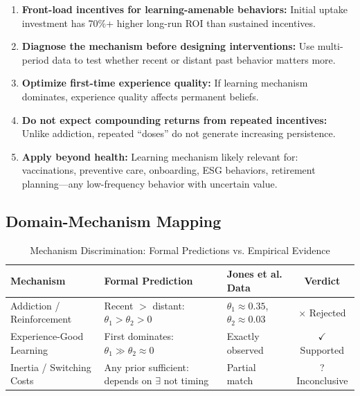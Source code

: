 \begin{tcolorbox}[colback=green!5!white, colframe=green!75!black,
    title=Practical Implications]
\begin{enumerate}
\item \textbf{Front-load incentives for learning-amenable behaviors:}
   Initial uptake investment has 70\%+ higher long-run ROI than sustained incentives.

\item \textbf{Diagnose the mechanism before designing interventions:}
   Use multi-period data to test whether recent or distant past behavior matters more.

\item \textbf{Optimize first-time experience quality:}
   If learning mechanism dominates, experience quality affects permanent beliefs.

\item \textbf{Do not expect compounding returns from repeated incentives:}
   Unlike addiction, repeated ``doses'' do not generate increasing persistence.

\item \textbf{Apply beyond health:}
   Learning mechanism likely relevant for: vaccinations, preventive care, onboarding,
   ESG behaviors, retirement planning---any low-frequency behavior with uncertain value.
\end{enumerate}
\end{tcolorbox}

\subsection{Domain-Mechanism Mapping}

\begin{table}[htbp]
\centering
\caption{Mechanism Discrimination: Formal Predictions vs. Empirical Evidence}
\label{tab:hf-mechanism-discrimination}
\renewcommand{\arraystretch}{1.4}
\begin{tabular}{@{}p{3cm}p{4.5cm}p{3cm}c@{}}
\toprule
\textbf{Mechanism} & \textbf{Formal Prediction} & \textbf{Jones et al. Data} & \textbf{Verdict} \\
\midrule
Addiction / Reinforcement & Recent $>$ distant: $\theta_1 > \theta_2 > 0$ & $\theta_1 \approx 0.35$, $\theta_2 \approx 0.03$ & $\times$ Rejected \\
Experience-Good Learning & First dominates: $\theta_1 \gg \theta_2 \approx 0$ & Exactly observed & $\checkmark$ Supported \\
Inertia / Switching Costs & Any prior sufficient: depends on $\exists$ not timing & Partial match & ? Inconclusive \\
\bottomrule
\end{tabular}
\end{table}

